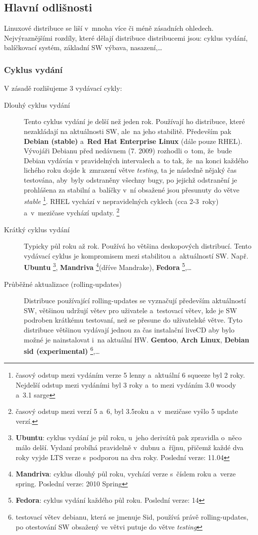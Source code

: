 \documentclass[a4paper,12pt]{article}
\renewcommand{\b}[1]{\textbf{#1}} %
\renewcommand{\it}[1]{\textit{#1}}		%
\begin{document}
\subsection{Hlavní odlišnosti}
Linuxové distribuce se liší v~mnoha více či méně zásadních ohledech. Nejvýraznějšími rozdíly, které dělají distribuce distribucemi jsou: cyklus vydání, balíčkovací systém, základní SW výbava, nasazení,…
\subsubsection{Cyklus vydání}
V zásadě rozlišujeme 3 vydávací cykly:
\begin{description}
 \item[Dlouhý cyklus vydání] Tento cyklus vydání je delší než jeden rok. Používají ho distribuce, které nezakládají na aktuálnosti SW, ale~na jeho stabilitě. Především pak \b{Debian (stable)} a~\b{Red Hat Enterprise Linux} (dále pouze RHEL). Vývojáři Debianu před nedávnem (7. 2009) rozhodli o~tom, že~bude Debian vydáván v pravidelných intervalech a~to tak, že~na konci každého lichého roku dojde k~zmrazení větve \it{testing}, ta je následně nějaký čas testována, aby~byly odstraněny všechny bugy, po jejichž odstranění je prohlášena za stabilní a~balíčky v~ní obsažené jsou přesunuty do větve \it{stable}
\footnote{časový odstup mezi vydáním verze 5 lenny a~aktuální 6 squeeze byl 2 roky. Nejdelší odstup mezi vydáními byl 3 roky a~to mezi vydáním 3.0 woody a~3.1 sarge}. RHEL vychází v nepravidelných cyklech (cca 2-3~roky) a~v~mezičase vychází updaty. 
\footnote{časový odstup mezi verzí 5 a~6, byl 3.5roku a~v~mezičase vyšlo 5 update verzí.}
 \item[Krátký cyklus vydání] Typicky půl roku až rok. Používá ho většina deskopových distribucí. Tento vydávací cyklus je kompromisem mezi stabilitou a~aktuálností SW. Např. \b{Ubuntu}
\footnote{\b{Ubuntu}: cyklus vydání je půl roku, u~jeho derivátů pak zpravidla o~něco málo delší. Vydaní probíhá pravidelně v~dubnu a~říjnu, přičemž každé dva roky vyjde LTS verze s~podporou na dva roky. Poslední verze: 11.04}, \b{Mandriva} 
\footnote{\b{Mandriva}: cyklus dlouhý půl roku, vychází verze s~číslem roku a~verze spring. Poslední verze: 2010 Spring}(dříve Mandrake), \b{Fedora} 
\footnote{\b{Fedora}: cyklus vydání každého půl roku. Poslední verze: 14},…
 \item[Průběžné aktualizace (rolling-updates)] Distribuce používající rolling-updates se vyznačují především aktuálností SW, většinou udržují větev pro uživatele a~testovací větev, kde je SW podroben krátkému testovaní, než se přesune do uživatelské větve. Tyto distribuce většinou vydávají jednou za čas instalační liveCD aby bylo možné je nainstalovat i~na aktuální HW. \b{Gentoo}, \b{Arch Linux}, \b{Debian sid (experimental)}
\footnote{testovací větev debianu, která se jmenuje Sid, používá právě rolling-updates, po otestování SW obsažený ve větvi putuje do větve \it{testing}},…
 \end{description}
\end{document}
